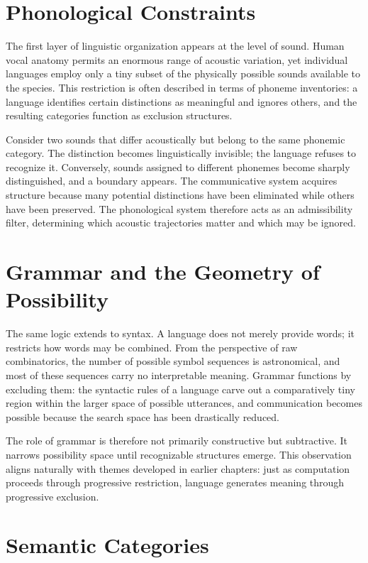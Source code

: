 \documentclass[11pt,oneside]{book}
\theoremstyle{plain}
\theoremstyle{definition}
\theoremstyle{remark}
\begin{document}
\section{Phonological Constraints}

The first layer of linguistic organization appears at the level of sound. Human vocal anatomy permits an enormous range of acoustic variation, yet individual languages employ only a tiny subset of the physically possible sounds available to the species. This restriction is often described in terms of phoneme inventories: a language identifies certain distinctions as meaningful and ignores others, and the resulting categories function as exclusion structures.

Consider two sounds that differ acoustically but belong to the same phonemic category. The distinction becomes linguistically invisible; the language refuses to recognize it. Conversely, sounds assigned to different phonemes become sharply distinguished, and a boundary appears. The communicative system acquires structure because many potential distinctions have been eliminated while others have been preserved. The phonological system therefore acts as an admissibility filter, determining which acoustic trajectories matter and which may be ignored.

\section{Grammar and the Geometry of Possibility}

The same logic extends to syntax. A language does not merely provide words; it restricts how words may be combined. From the perspective of raw combinatorics, the number of possible symbol sequences is astronomical, and most of these sequences carry no interpretable meaning. Grammar functions by excluding them: the syntactic rules of a language carve out a comparatively tiny region within the larger space of possible utterances, and communication becomes possible because the search space has been drastically reduced.

The role of grammar is therefore not primarily constructive but subtractive. It narrows possibility space until recognizable structures emerge. This observation aligns naturally with themes developed in earlier chapters: just as computation proceeds through progressive restriction, language generates meaning through progressive exclusion.

\section{Semantic Categories}
\end{document}

